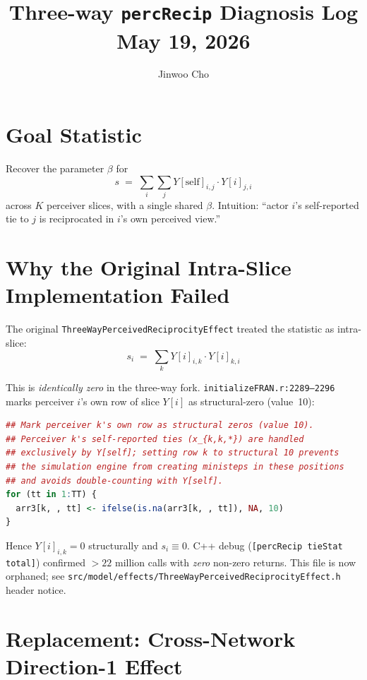 \documentclass[11pt]{article}
\title{Three-way \texttt{percRecip} Diagnosis Log\\[4pt]
\large May 19, 2026}
\author{Jinwoo Cho}
\date{}
\newcommand{\self}{\mathrm{self}}
\newcommand{\file}[1]{\texttt{#1}}
\begin{document}
\maketitle

\section{Goal Statistic}

Recover the parameter $\beta$ for
\[
s \;=\; \sum_i \sum_j Y[\self]_{i,j} \cdot Y[i]_{j,i}
\]
across $K$ perceiver slices, with a single shared $\beta$.  Intuition:
``actor $i$'s self-reported tie to $j$ is reciprocated in $i$'s own
perceived view.''

\section{Why the Original Intra-Slice Implementation Failed}

The original \file{ThreeWayPerceivedReciprocityEffect} treated the
statistic as intra-slice:
\[
s_i \;=\; \sum_k Y[i]_{i,k} \cdot Y[i]_{k,i}
\]

This is \emph{identically zero} in the three-way fork.
\file{initializeFRAN.r:2289--2296} marks perceiver $i$'s own row of
slice $Y[i]$ as structural-zero (value~10):
\begin{lstlisting}[language=R]
## Mark perceiver k's own row as structural zeros (value 10).
## Perceiver k's self-reported ties (x_{k,k,*}) are handled
## exclusively by Y[self]; setting row k to structural 10 prevents
## the simulation engine from creating ministeps in these positions
## and avoids double-counting with Y[self].
for (tt in 1:TT) {
  arr3[k, , tt] <- ifelse(is.na(arr3[k, , tt]), NA, 10)
}
\end{lstlisting}

Hence $Y[i]_{i,k} = 0$ structurally and $s_i \equiv 0$.  C++ debug
(\texttt{[percRecip tieStat total]}) confirmed $> 22$ million calls
with \emph{zero} non-zero returns.  This file is now orphaned;
see \file{src/model/effects/ThreeWayPerceivedReciprocityEffect.h}
header notice.

\section{Replacement: Cross-Network Direction-1 Effect}
\end{document}

